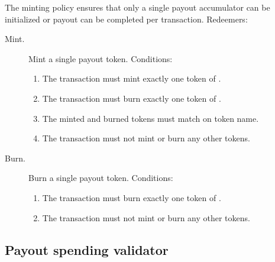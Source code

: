 \documentclass[../midgard.tex]{subfiles}
\begin{document}
The  minting policy ensures that only a single payout accumulator can be initialized or payout can be completed per transaction.
Redeemers:
\begin{description}
  \item[Mint.] Mint a single payout token.
    Conditions:
    \begin{enumerate}
      \item The transaction must mint exactly one token of .
      \item The transaction must burn exactly one token of .
      \item The minted and burned tokens must match on token name.
      \item The transaction must not mint or burn any other tokens.
    \end{enumerate}
  \item[Burn.] Burn a single payout token.
    Conditions:
    \begin{enumerate}
      \item The transaction must burn exactly one token of .
      \item The transaction must not mint or burn any other tokens.
    \end{enumerate}
\end{description}

\subsection{Payout spending validator}%
\label{h:payout-spending-validator}%
\end{document}

